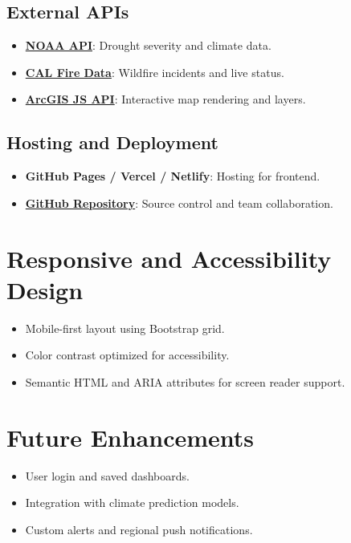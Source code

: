 \documentclass[12pt]{article}
\begin{document}
\subsection{External APIs}
\begin{itemize}[leftmargin=*]
    \item \href{https://www.ncei.noaa.gov/}{\textbf{NOAA API}}: Drought severity and climate data.
    \item \href{https://www.fire.ca.gov/incidents/}{\textbf{CAL Fire Data}}: Wildfire incidents and live status.
    \item \href{https://developers.arcgis.com/javascript/}{\textbf{ArcGIS JS API}}: Interactive map rendering and layers.
\end{itemize}

\subsection{Hosting and Deployment}
\begin{itemize}[leftmargin=*]
    \item \textbf{GitHub Pages / Vercel / Netlify}: Hosting for frontend.
    \item \href{https://github.com/HuyLam2004/CS3338-final-project}{\textbf{GitHub Repository}}: Source control and team collaboration.
\end{itemize}

\section{Responsive and Accessibility Design}
\begin{itemize}[leftmargin=*]
    \item Mobile-first layout using Bootstrap grid.
    \item Color contrast optimized for accessibility.
    \item Semantic HTML and ARIA attributes for screen reader support.
\end{itemize}

\section{Future Enhancements}
\begin{itemize}[leftmargin=*]
    \item User login and saved dashboards.
    \item Integration with climate prediction models.
    \item Custom alerts and regional push notifications.
\end{itemize}
\end{document}
